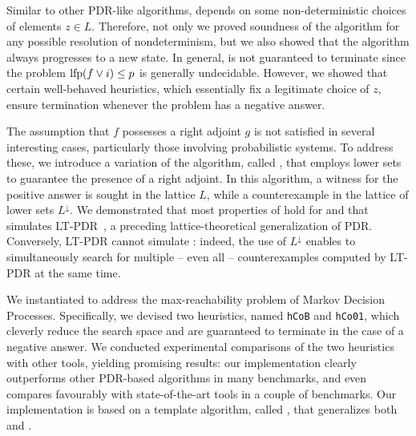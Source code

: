 Similar to other PDR-like algorithms, \APDR{} depends on some non-deterministic choices of elements $z \in L$. Therefore, not only we proved soundness of the algorithm for any possible resolution of nondeterminism, but we also showed that the algorithm always progresses to a new state. In general, \APDR{} is not guaranteed to terminate since the problem $\text{lfp}(f\lor i) \le p$ is generally undecidable. However, we showed that certain well-behaved heuristics, which essentially fix a legitimate choice of $z$, ensure termination whenever the problem has a negative answer.

The assumption that $f$ possesses a right adjoint $g$ is not satisfied in several interesting cases, particularly those involving probabilistic systems. To address these, we introduce a variation of the algorithm, called \ADPDR{}, that employs lower sets to guarantee the presence of a right adjoint. In this algorithm, a witness for the positive answer is sought in the lattice $L$, while a counterexample in the lattice of lower sets $L^\downarrow$. We demonstrated that most properties of \APDR{} hold for \ADPDR{} and that \ADPDR{} simulates LT-PDR~\cite{KUKSH22}, a preceding lattice-theoretical generalization of PDR. Conversely, LT-PDR cannot simulate \ADPDR{}: indeed, the use of $L^\downarrow$ enables \ADPDR{} to simultaneously search for multiple -- even all -- counterexamples computed by LT-PDR at the same time.

We instantiated \ADPDR{} to address the max-reachability problem of Markov Decision Processes. Specifically, we devised two heuristics, named \verb|hCoB| and \verb|hCo01|, which cleverly reduce the search space and are guaranteed to terminate in the case of a negative answer. We conducted experimental comparisons of the two heuristics with other tools, yielding promising results: our implementation clearly outperforms other PDR-based algorithms in many benchmarks, and even compares favourably with state-of-the-art tools in a couple of benchmarks. Our implementation is based on a template algorithm, called \APDRAI{}, that generalizes both \APDR{} and \ADPDR{}.
